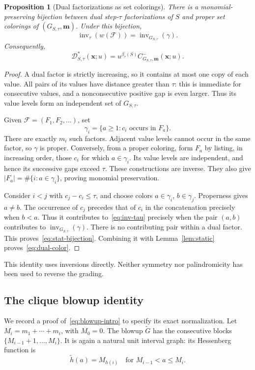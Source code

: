 \documentclass[11pt,reqno]{amsart}
\newcommand{\xx}{\mathbf x}
\newcommand{\mm}{\mathbf m}
\newcommand{\DD}{\mathcal D}
\newcommand{\inv}{\operatorname{inv}}
\newtheorem{proposition}[theorem]{Proposition}
\theoremstyle{definition}
\theoremstyle{remark}
\numberwithin{equation}{section}
\begin{document}
\begin{proposition}[Dual factorizations as set colorings]\label{prop:bijection}
There is a monomial-preserving bijection between dual step-$\tau$
factorizations of $S$ and proper set colorings of $(G_{S,\tau},\mm)$.
Under this bijection,
\begin{equation}\label{eq:stat-bijection}
 \inv_\tau(w(\mathcal F))=\inv_{G_{S,\tau}}(\gamma).
\end{equation}
Consequently,
\begin{equation}\label{eq:dual-color}
 \DD^*_{S,\tau}(\xx;u)
   =u^{\beta_\tau(S)}C^-_{G_{S,\tau},\mm}(\xx;u).
\end{equation}
\end{proposition}
\begin{proof}
A dual factor is strictly increasing, so it contains at most one copy of
each value.  All pairs of its values have distance greater than $\tau$:
this is immediate for consecutive values, and a nonconsecutive
positive gap is even larger.  Thus its value levels form an independent
set of $G_{S,\tau}$.

Given $\mathcal F=(F_1,F_2,\ldots)$, set
\[
 \gamma_i=\{a\geq1:c_i\text{ occurs in }F_a\}.
\]
There are exactly $m_i$ such factors.  Adjacent value levels cannot
occur in the same factor, so $\gamma$ is proper.  Conversely, from a
proper coloring, form $F_a$ by listing, in increasing order, those
$c_i$ for which $a\in\gamma_i$.  Its value levels are independent, and
hence its successive gaps exceed $\tau$.  These constructions are
inverse.  They also give
$|F_a|=\#\{i:a\in\gamma_i\}$, proving monomial preservation.

Consider $i<j$ with $c_j-c_i\leq\tau$, and choose colors
$a\in\gamma_i$, $b\in\gamma_j$.  Properness gives $a\ne b$.
The occurrence of $c_j$ precedes that of $c_i$ in the concatenation
precisely when $b<a$.  Thus it contributes to~\eqref{eq:inv-tau}
precisely when the pair $(a,b)$ contributes to
$\inv_{G_{S,\tau}}(\gamma)$.  There is no contributing pair within a
dual factor.  This proves~\eqref{eq:stat-bijection}.
Combining it with Lemma~\ref{lem:static} proves~\eqref{eq:dual-color}.
\end{proof}

This identity uses inversions directly.  Neither symmetry nor
palindromicity has been used to reverse the grading.

\subsection{The clique blowup identity}
We record a proof of~\eqref{eq:blowup-intro} to specify its exact
normalization.  Let $M_i=m_1+\cdots+m_i$, with $M_0=0$.  The blowup
$\widetilde G$ has the consecutive blocks
$\{M_{i-1}+1,\ldots,M_i\}$.  It is again a natural unit interval graph:
its Hessenberg function is
\begin{equation}\label{eq:blowup-h}
 \widetilde h(a)=M_{h(i)}
 \quad\text{for }M_{i-1}<a\leq M_i.
\end{equation}
\end{document}
